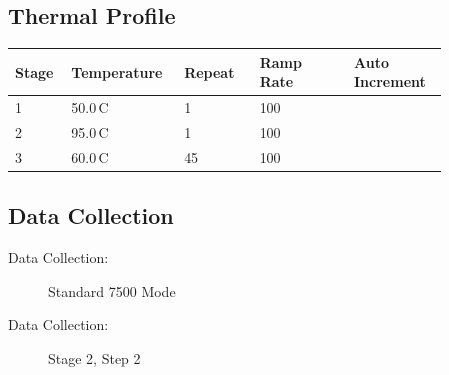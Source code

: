 \documentclass[UTF8,10pt,a4paper,fontset=fandol]{ctexart}
\newcommand{\fieldvalue}[1]{#1}
\begin{document}
\subsection{Thermal Profile}

\begin{center}
\small
\begin{tabular}{|p{0.10\linewidth}|p{0.20\linewidth}|p{0.16\linewidth}|p{0.20\linewidth}|p{0.20\linewidth}|}
\hline
\textbf{Stage} & \textbf{Temperature} & \textbf{Repeat} &
\textbf{Ramp Rate} & \textbf{Auto Increment} \\
\hline
1 &
\fieldvalue{50.0\,\textdegree C} &
\fieldvalue{1} &
\fieldvalue{100} &
\fieldvalue{} \\
\hline
2 &
\fieldvalue{95.0\,\textdegree C} &
\fieldvalue{1} &
\fieldvalue{100} &
\fieldvalue{} \\
\hline
3 &
\fieldvalue{60.0\,\textdegree C} &
\fieldvalue{45} &
\fieldvalue{100} &
\fieldvalue{} \\
\hline
\end{tabular}
\end{center}

\subsection{Data Collection}

\begin{description}
  \item[Data Collection:]%
  \fieldvalue{Standard 7500 Mode}

  \item[Data Collection:]%
  \fieldvalue{Stage 2, Step 2}
\end{description}
\end{document}
